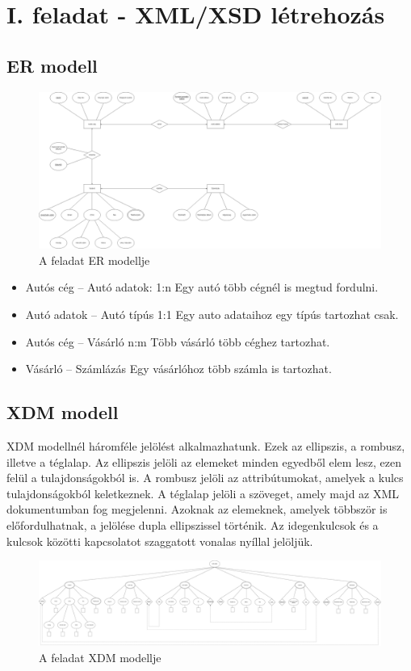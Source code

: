 \documentclass[12pt]{report}
\begin{document}
\chapter{I. feladat - XML/XSD létrehozás}

\section{ER modell}

\begin{figure}[h]
	\centering
	\includegraphics[width=0.999\linewidth]{ERV9ZK10.drawio.png}
	\caption{A feladat ER modellje}
\end{figure}

\begin{itemize}
	\item Autós cég – Autó adatok: 1:n Egy autó több cégnél is megtud fordulni.
	\item Autó adatok – Autó típús 1:1 Egy auto adataihoz egy típús tartozhat csak.
	\item Autós cég – Vásárló n:m  Több vásárló több céghez tartozhat. 
	\item Vásárló – Számlázás Egy vásárlóhoz több számla is tartozhat.
	
\end{itemize}

\section{XDM modell}

XDM modellnél háromféle jelölést alkalmazhatunk. Ezek az ellipszis, a rombusz, illetve a téglalap. Az ellipszis jelöli az elemeket minden egyedből elem lesz, ezen felül a tulajdonságokból is. A rombusz jelöli az attribútumokat, amelyek a kulcs tulajdonságokból keletkeznek. A téglalap jelöli a szöveget, amely majd az XML dokumentumban fog megjelenni. Azoknak az elemeknek, amelyek többször is előfordulhatnak, a jelölése dupla ellipszissel történik. Az idegenkulcsok és a kulcsok közötti kapcsolatot szaggatott vonalas nyíllal jelöljük.
\begin{figure}[h]
	\centering
	\includegraphics[width=1.01\linewidth]{XDMV9ZK10.drawio.png}
	\caption{A feladat XDM modellje}
\end{figure}
\end{document}
